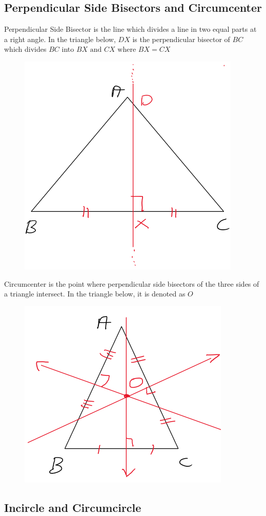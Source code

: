 \subsection{Perpendicular Side Bisectors and Circumcenter}
Perpendicular Side Bisector is the line which divides a line in two equal parts at a right angle. In the triangle below, $DX$ is the perpendicular bisector of $BC$ which divides $BC$ into $BX \text{ and } CX \text{ where } BX = CX$

\begin{figure}[h!]
    \centering
    \includegraphics[width=0.5\linewidth]{Quant//Geometry//Images//Triangles/perpendicular_side_bisector.png}
\end{figure}

Circumcenter is the point where perpendicular side bisectors of the three sides of a triangle intersect. In the triangle below, it is denoted as $O$

\begin{figure}[h!]
    \centering
    \includegraphics[width=0.5\linewidth]{Quant//Geometry//Images//Triangles/circumcenter.png}
\end{figure}

\newpage

\subsection{Incircle and Circumcircle}

